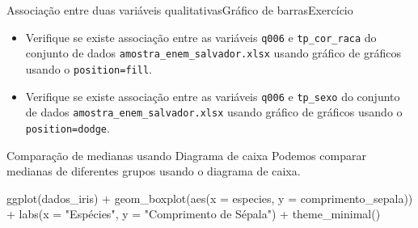 \documentclass[
  10pt,
  ignorenonframetext,
]{beamer}
\newenvironment{Shaded}{\begin{snugshade}}{\end{snugshade}}
\newcommand{\AttributeTok}[1]{\textcolor[rgb]{0.40,0.45,0.13}{#1}}
\newcommand{\FunctionTok}[1]{\textcolor[rgb]{0.28,0.35,0.67}{#1}}
\newcommand{\NormalTok}[1]{\textcolor[rgb]{0.00,0.23,0.31}{#1}}
\newcommand{\SpecialCharTok}[1]{\textcolor[rgb]{0.37,0.37,0.37}{#1}}
\newcommand{\StringTok}[1]{\textcolor[rgb]{0.13,0.47,0.30}{#1}}
\providecommand{\tightlist}{%
  \setlength{\itemsep}{0pt}\setlength{\parskip}{0pt}}\usepackage{longtable,booktabs,array}
\begin{document}
\begin{frame}[fragile]{Associação entre duas variáveis
qualitativas\newline Gráfico de barras\newline Exercício}
\protect\hypertarget{associauxe7uxe3o-entre-duas-variuxe1veis-qualitativasgruxe1fico-de-barrasexercuxedcio}{}
\begin{itemize}
\tightlist
\item
  Verifique se existe associação entre as variáveis \texttt{q006} e
  \texttt{tp\_cor\_raca} do conjunto de dados
  \texttt{amostra\_enem\_salvador.xlsx} usando gráfico de gráficos
  usando o \texttt{position=fill}.
\item
  Verifique se existe associação entre as variáveis \texttt{q006} e
  \texttt{tp\_sexo} do conjunto de dados
  \texttt{amostra\_enem\_salvador.xlsx} usando gráfico de gráficos
  usando o \texttt{position=dodge}.
\end{itemize}
\end{frame}

\begin{frame}[fragile]{Comparação de medianas usando Diagrama de caixa}
\protect\hypertarget{comparauxe7uxe3o-de-medianas-usando-diagrama-de-caixa}{}
Podemos comparar medianas de diferentes grupos usando o diagrama de
caixa.

\begin{Shaded}
\begin{Highlighting}[]
\FunctionTok{ggplot}\NormalTok{(dados\_iris) }\SpecialCharTok{+}
  \FunctionTok{geom\_boxplot}\NormalTok{(}\FunctionTok{aes}\NormalTok{(}\AttributeTok{x =}\NormalTok{ especies, }\AttributeTok{y =}\NormalTok{ comprimento\_sepala)) }\SpecialCharTok{+}
  \FunctionTok{labs}\NormalTok{(}\AttributeTok{x =} \StringTok{"Espécies"}\NormalTok{, }\AttributeTok{y =} \StringTok{"Comprimento de Sépala"}\NormalTok{) }\SpecialCharTok{+}
  \FunctionTok{theme\_minimal}\NormalTok{()}
\end{Highlighting}
\end{Shaded}
\end{frame}
\end{document}
